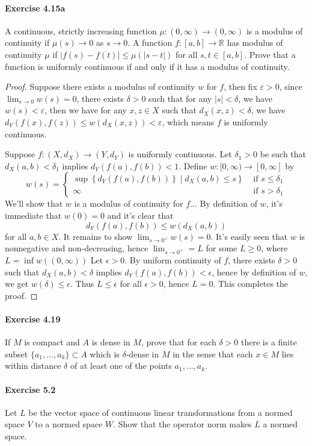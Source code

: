\documentclass{article}
\begin{document}
\paragraph{Exercise 4.15a} A continuous, strictly increasing function $\mu \colon (0, \infty) \rightarrow (0, \infty)$ is a modulus of continuity if $\mu(s) \rightarrow 0$ as $s \rightarrow 0$. A function $f \colon [a, b] \rightarrow \mathbb{R}$ has modulus of continuity $\mu$ if $|f(s) - f(t)| \leq \mu(|s - t|)$ for all $s, t \in [a, b]$. Prove that a function is uniformly continuous if and only if it has a modulus of continuity.
\begin{proof}
    Suppose there exists a modulus of continuity $w$ for $f$, then fix $\varepsilon>0$, since $\lim _{s \rightarrow 0} w(s)=0$, there exists $\delta>0$ such that for any $|s|<\delta$, we have $w(s)<\varepsilon$, then we have for any $x, z \in X$ such that $d_X(x, z)<\delta$, we have $d_Y(f(x), f(z)) \leq w\left(d_X(x, z)\right)<\varepsilon$, which means $f$ is uniformly continuous.

Suppose $f:\left(X, d_X\right) \rightarrow\left(Y, d_Y\right)$ is uniformly continuous.
Let $\delta_1>0$ be such that $d_X(a, b)<\delta_1$ implies $d_Y(f(a), f(b))<1$.
Define $w:[0, \infty) \rightarrow[0, \infty]$ by
$$
w(s)= \begin{cases}\left.\sup \left\{d_Y(f(a), f(b))\right\} \mid d_X(a, b) \leq s\right\} & \text { if } s \leq \delta_1 \\ \infty & \text { if } s>\delta_1\end{cases}
$$
We'll show that $w$ is a modulus of continuity for $f \ldots$
By definition of $w$, it's immediate that $w(0)=0$ and it's clear that
$$
d_Y(f(a), f(b)) \leq w\left(d_X(a, b)\right)
$$
for all $a, b \in X$.
It remains to show $\lim _{s \rightarrow 0^{+}} w(s)=0$.
It's easily seen that $w$ is nonnegative and non-decreasing, hence $\lim _{s \rightarrow 0^{+}}=L$ for some $L \geq 0$, where $L=\inf w((0, \infty))$
Let $\epsilon>0$.
By uniform continuity of $f$, there exists $\delta>0$ such that $d_X(a, b)<\delta$ implies $d_Y(f(a), f(b))<\epsilon$, hence by definition of $w$, we get $w(\delta) \leq \epsilon$.
Thus $L \leq \epsilon$ for all $\epsilon>0$, hence $L=0$.
This completes the proof.
\end{proof}



\paragraph{Exercise 4.19} If $M$ is compact and $A$ is dense in $M$, prove that for each $\delta > 0$ there is a finite subset $\{a_1, \ldots , a_k\} \subset A$ which is $\delta$-dense in $M$ in the sense that each $x \in M$ lies within distance $\delta$ of at least one of the points $a_1,\ldots, a_k$.


\paragraph{Exercise 5.2} Let $L$ be the vector space of continuous linear transformations from a normed space $V$ to a normed space $W$. Show that the operator norm makes $L$ a normed space.
\end{document}
